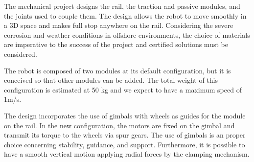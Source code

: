 \documentclass{ifacconf}
\begin{document}
% 

The mechanical project designs the rail, the
traction and passive modules, and the joints used to couple them. The design
allows the robot to move smoothly in a 3D space and makes full stop anywhere
on the rail. Considering the severe corrosion and weather conditions in
offshore environments, the choice of materials are imperative to the success of
the project and certified solutions must be considered.

The robot is composed of two modules at its default configuration, but it is
conceived so that other modules can be added. The total weight of this
configuration is estimated at 50 kg and we expect to have a maximum speed of
1m/s.

The design incorporates the use of gimbals with wheels as guides for
the module on the rail. In the new configuration, the motors are
fixed on the gimbal and transmit its torque to the wheels via spur gears. The use of gimbals
is an proper choice concerning stability, guidance, and support. Furthermore,
it is possible to have a smooth vertical motion applying radial forces by the
clamping mechanism.
\end{document}
